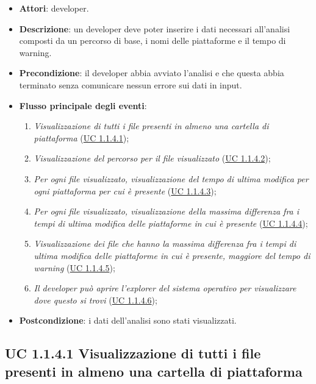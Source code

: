 		\begin{itemize}
			\item\textbf{Attori}: developer.
			\item\textbf{Descrizione}: un developer deve poter inserire i dati necessari all'analisi composti da un percorso di base, i nomi delle piattaforme e il tempo di warning.
			\item\textbf{Precondizione}: il developer abbia avviato l'analisi e che questa abbia terminato senza comunicare nessun errore sui dati in input.
			\item\textbf{Flusso principale degli eventi}: 
			\begin{enumerate}
				\item\textit{Visualizzazione di tutti i file presenti in almeno una cartella di piattaforma} (\hyperref[subsec:UC1.1.4.1]{UC 1.1.4.1});
				
				\item\textit{Visualizzazione del percorso per il file visualizzato} (\hyperref[subsec:UC1.1.4.2]{UC 1.1.4.2});
				
				\item\textit{Per ogni file visualizzato, visualizzazione del tempo di ultima modifica per ogni piattaforma per cui è presente} (\hyperref[subsec:UC1.1.4.3]{UC 1.1.4.3});
				
				\item\textit{Per ogni file visualizzato, visualizzazione della massima differenza fra i tempi di ultima modifica delle piattaforme in cui è presente} (\hyperref[subsec:UC1.1.4.4]{UC 1.1.4.4});
				
				\item\textit{Visualizzazione dei file che hanno la massima differenza fra i tempi di ultima modifica delle piattaforme in cui è presente, maggiore del tempo di warning} (\hyperref[subsec:UC1.1.4.5]{UC 1.1.4.5});
				
				\item\textit{Il developer può aprire l'explorer del sistema operativo per visualizzare dove questo si trovi} (\hyperref[subsec:UC1.1.4.6]{UC 1.1.4.6});
				
			\end{enumerate}
			\item\textbf{Postcondizione}: i dati dell'analisi sono stati visualizzati.
		\end{itemize}

	\subsection{UC 1.1.4.1 Visualizzazione di tutti i file presenti in almeno una cartella di piattaforma}
		\label{subsec:UC1.1.4.1}
		
